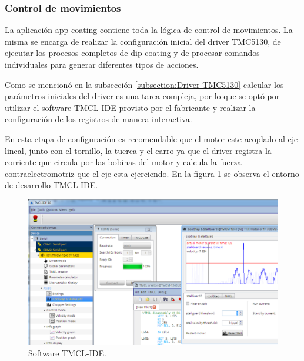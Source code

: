 \subsubsection{Control de movimientos}

La aplicación app coating contiene toda la lógica de control de movimientos. La misma se encarga de realizar la configuración inicial del driver TMC5130, de ejecutar los procesos completos de dip coating y de procesar comandos individuales para generar diferentes tipos de acciones. 

Como se mencionó en la subsección \ref{subsection:Driver TMC5130} calcular los parámetros iniciales del driver es una tarea compleja, por lo que se optó por utilizar el software TMCL-IDE provisto por el fabricante y realizar la configuración de los registros de manera interactiva.


En esta etapa de configuración es recomendable que el motor este acoplado al eje lineal, junto con el tornillo, la tuerca y el carro ya que el driver registra la corriente que circula por las bobinas del motor y calcula la fuerza contraelectromotriz que el eje esta ejerciendo. 
En la figura \ref{fig:tmcl_ide} se observa el entorno de desarrollo TMCL-IDE.  

\begin{figure}[h!]
	\centering
	\includegraphics[width=1\textwidth]{./Figures/tmcl_ide_1.png}
	\caption{Software TMCL-IDE.}
	\label{fig:tmcl_ide}
\end{figure}


